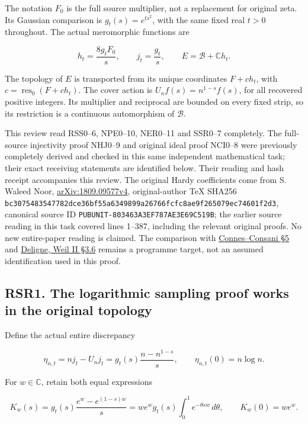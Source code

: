 The notation \(F_0\) is the full source multiplier, not a replacement
for original zeta. Its Gaussian comparison is \(g_t(s)=e^{ts^2}\), with
the same fixed real \(t>0\) throughout. The actual meromorphic functions
are

\[
h_t=\frac{8g_tF_0}{s},\qquad j_t=\frac{g_t}{s},\qquad
E=\mathcal B+\mathbb C h_t.
\tag{RSR0.4}
\]

The topology of \(E\) is transported from its unique coordinates
\(F+ch_t\), with \(c=\operatorname{res}_0(F+ch_t)\). The cover action is
\(U_nf(s)=n^{1-s}f(s)\), for all recovered positive integers. Its
multiplier and reciprocal are bounded on every fixed strip, so its
restriction is a continuous automorphism of \(\mathcal B\).

This review read RSS0--6, NPE0--10, NER0--11 and SSR0--7 completely. The
full-source injectivity proof NHJ0--9 and original ideal proof NCI0--8
were previously completely derived and checked in this same independent
mathematical task; their exact receiving statements are identified
below. Their reading and hash receipt accompanies this review. The
original Hardy coefficients come from S. Waleed Noor,
\href{https://arxiv.org/abs/1809.09577v4}{arXiv:1809.09577v4},
original-author TeX SHA256
\nolinkurl{bc3075483547782dce36bf55a6349899a26766fcfc8ae9f265079ec74601f2d3},
canonical source ID \nolinkurl{PUBUNIT-803463A3EF787AE3E69C519B}; the
earlier source reading in this task covered lines 1--387, including the
relevant original proofs. No new entire-paper reading is claimed. The
comparison with \href{https://arxiv.org/abs/0903.2024v3}{Connes--Consani
§5} and \href{https://numdam.org/item/PMIHES_1980__52__137_0/}{Deligne,
Weil II §3.6} remains a programme target, not an assumed identification
used in this proof.

\subsection{RSR1. The logarithmic sampling proof works in the original
topology}\label{rsr1.-the-logarithmic-sampling-proof-works-in-the-original-topology}

Define the actual entire discrepancy

\[
\eta_{n,t}=nj_t-U_nj_t=g_t(s)\frac{n-n^{1-s}}s,
\qquad \eta_{n,t}(0)=n\log n.
\tag{RSR1.1}
\]

For \(w\in\mathbb C\), retain both equal expressions

\[
K_w(s)=g_t(s)\frac{e^w-e^{(1-s)w}}s
=we^wg_t(s)\int_0^1e^{-\theta sw}\,d\theta,
\qquad K_w(0)=we^w.
\tag{RSR1.2}
\]

